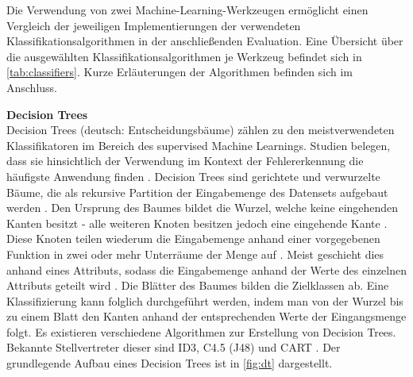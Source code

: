 Die Verwendung von zwei Machine-Learning-Werkzeugen ermöglicht einen Vergleich der jeweiligen Implementierungen der verwendeten Klassifikationsalgorithmen in der anschließenden Evaluation. Eine Übersicht über die ausgewählten Klassifikationsalgorithmen je Werkzeug befindet sich in \autoref{tab:classifiers}. Kurze Erläuterungen der Algorithmen befinden sich im Anschluss.

\begin{table}[t]
\centering
\caption{Zum Training verwendete Klassifikationsalgorithmen}
\label{tab:classifiers}
\end{table}

\label{algorithms}
\textbf{Decision Trees\medskip}\\
Decision Trees (deutsch: Entscheidungsbäume) zählen zu den meistverwendeten Klassifikatoren im Bereich des supervised Machine Learnings. Studien belegen, dass sie hinsichtlich der Verwendung im Kontext der Fehlererkennung die häufigste Anwendung finden \cite{Son2019}. Decision Trees sind gerichtete und verwurzelte Bäume, die als rekursive Partition der Eingabemenge des Datensets aufgebaut werden \cite{Rokach2005}. Den Ursprung des Baumes bildet die Wurzel, welche keine eingehenden Kanten besitzt - alle weiteren Knoten besitzen jedoch eine eingehende Kante \cite{Rokach2005}. Diese Knoten teilen wiederum die Eingabemenge anhand einer vorgegebenen Funktion in zwei oder mehr Unterräume der Menge auf \cite{Rokach2005}. Meist geschieht dies anhand eines Attributs, sodass die Eingabemenge anhand der Werte des einzelnen Attributs geteilt wird \cite{Rokach2005}. Die Blätter des Baumes bilden die Zielklassen ab. Eine Klassifizierung kann folglich durchgeführt werden, indem man von der Wurzel bis zu einem Blatt den Kanten anhand der entsprechenden Werte der Eingangsmenge folgt. Es existieren verschiedene Algorithmen zur Erstellung von Decision Trees. Bekannte Stellvertreter dieser sind ID3, C4.5 (J48) und CART \cite{Rokach2005}. Der grundlegende Aufbau eines Decision Trees ist in \autoref{fig:dt} dargestellt.

